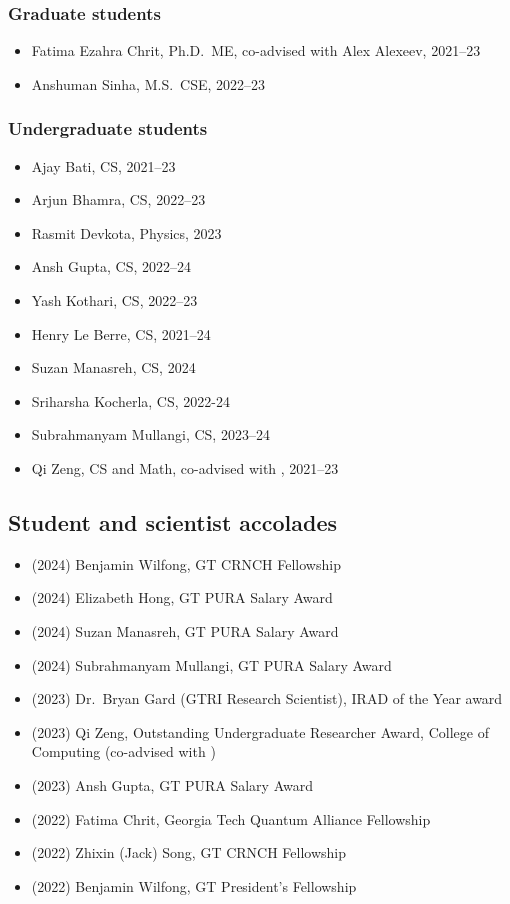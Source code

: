 \subsubsection{Graduate students}

\begin{itemize}
    \item Fatima Ezahra Chrit, Ph.D.\ ME, co-advised with Alex Alexeev, 2021--23
    \item Anshuman Sinha, M.S.\ CSE, 2022--23
\end{itemize}

\subsubsection{Undergraduate students}

\begin{itemize}
    \item Ajay Bati, CS, 2021--23
    \item Arjun Bhamra, CS, 2022--23
    \item Rasmit Devkota, Physics, 2023
    \item Ansh Gupta, CS, 2022--24
    \item Yash Kothari, CS, 2022--23
    \item Henry Le Berre, CS, 2021--24
    \item Suzan Manasreh, CS, 2024
    \item Sriharsha Kocherla, CS, 2022-24
    \item Subrahmanyam Mullangi, CS, 2023--24
    \item Qi Zeng, CS and Math, co-advised with \Florian, 2021--23
\end{itemize}

\subsection{Student and scientist accolades}

\begin{itemize}
    \item (2024) Benjamin Wilfong, GT CRNCH Fellowship
    \item (2024) Elizabeth Hong, GT PURA Salary Award
    \item (2024) Suzan Manasreh, GT PURA Salary Award
    \item (2024) Subrahmanyam Mullangi, GT PURA Salary Award
    \item (2023) Dr.\ Bryan Gard (GTRI Research Scientist), IRAD of the Year award
    \item (2023) Qi Zeng, Outstanding Undergraduate Researcher Award, College of Computing (co-advised with \Florian)
    \item (2023) Ansh Gupta, GT PURA Salary Award
    \item (2022) Fatima Chrit, Georgia Tech Quantum Alliance Fellowship
    \item (2022) Zhixin (Jack) Song, GT CRNCH Fellowship
    \item (2022) Benjamin Wilfong, GT President's Fellowship
\end{itemize}

